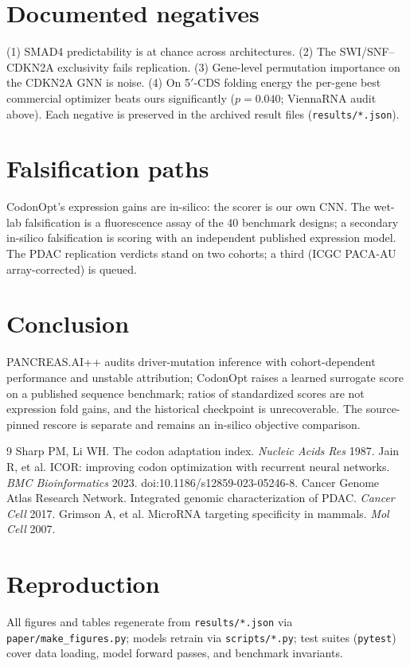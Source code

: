 \documentclass[11pt]{article}
\begin{document}


\section{Documented negatives}
(1) SMAD4 predictability is at chance across architectures. (2) The SWI/SNF--CDKN2A exclusivity fails replication. (3) Gene-level permutation importance on the CDKN2A GNN is noise. (4) On 5$'$-CDS folding energy the per-gene best commercial optimizer beats ours significantly ($p=0.040$; ViennaRNA audit above). Each negative is preserved in the archived result files (\texttt{results/*.json}).
\section{Falsification paths}
CodonOpt's expression gains are in-silico: the scorer is our own CNN. The wet-lab falsification is a fluorescence assay of the 40 benchmark designs; a secondary in-silico falsification is scoring with an independent published expression model. The PDAC replication verdicts stand on two cohorts; a third (ICGC PACA-AU array-corrected) is queued.
\section{Conclusion}
PANCREAS.AI++ audits driver-mutation inference with cohort-dependent performance and unstable attribution; CodonOpt raises a learned surrogate score on a published sequence benchmark; ratios of standardized scores are not expression fold gains, and the historical checkpoint is unrecoverable. The source-pinned rescore is separate and remains an in-silico objective comparison.
\begin{thebibliography}{9}
 Sharp PM, Li WH. The codon adaptation index. \emph{Nucleic Acids Res} 1987.
 Jain R, et al. ICOR: improving codon optimization with recurrent neural networks. \emph{BMC Bioinformatics} 2023. doi:10.1186/s12859-023-05246-8.
 Cancer Genome Atlas Research Network. Integrated genomic characterization of PDAC. \emph{Cancer Cell} 2017.
 Grimson A, et al. MicroRNA targeting specificity in mammals. \emph{Mol Cell} 2007.
\end{thebibliography}
\appendix








\section{Reproduction}
All figures and tables regenerate from \texttt{results/*.json} via \texttt{paper/make\_figures.py}; models retrain via \texttt{scripts/*.py}; test suites (\texttt{pytest}) cover data loading, model forward passes, and benchmark invariants.




\end{document}
